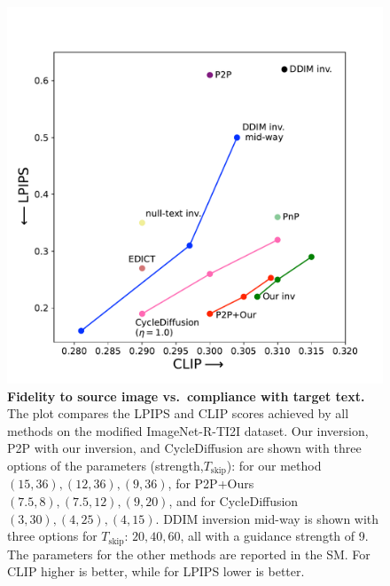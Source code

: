 \begin{figure}[h]
\centering
\includegraphics[trim={0 0.7cm 0 2.1cm},clip=true,width=1\columnwidth]{ICCV23_submission/figures/clip_lpips.pdf}
\caption{\textbf{Fidelity to source image vs.~compliance with target text.} The plot compares the LPIPS and CLIP scores achieved by all methods on the modified ImageNet-R-TI2I dataset.  Our inversion, P2P with our inversion, and CycleDiffusion are shown with three options of the parameters (strength,$T_{\text{skip}}$): for our method $(15,36),(12,36),(9,36)$, for P2P+Ours $(7.5,8),(7.5,12),(9,20)$, and for CycleDiffusion $(3,30),(4,25),(4,15)$. DDIM inversion mid-way is shown with three options for $T_{\text{skip}}$: $20, 40, 60$, all with a guidance strength of 9. The parameters for the other methods are reported in the SM. For CLIP higher is better, while for LPIPS lower is better.}%
\label{fig:clip_lpips}
\end{figure}



